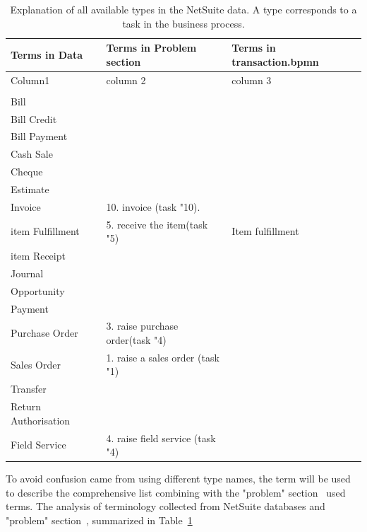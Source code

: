

\begin{table}[htb]
\footnotesize	 %
\begin{tabularx}{\textwidth}{X|X|X}
\hline
\textbf{Terms in Data} & \textbf{Terms in Problem section} & \textbf{Terms in transaction.bpmn} \\
\hline
Column1 & column 2 & column 3 \\
\hline 
 & &  \\
\hline
Bill &  & \\
\hline
Bill Credit  & &  \\
\hline
Bill Payment &  & \\
\hline
Cash Sale  &  & \\
\hline
Cheque  &  & \\
\hline
Estimate  &  & \\
\hline
Invoice  & 10. invoice (task "10). &  \\
\hline
item Fulfillment  & 5. receive the item(task "5) & Item fulfillment \\
\hline
item Receipt  &  & \\
\hline
Journal  &  \\
\hline
Opportunity  &  \\
\hline
Payment  &  \\
\hline
Purchase Order  & 3. raise purchase order(task "4)  \\
\hline
Sales Order  & 1. raise a sales order (task "1)  \\
\hline
Transfer  &  \\
\hline
Return Authorisation  &  \\
\hline
Field Service  & 4. raise field service (task "4)  \\
\hline
\end{tabularx}
\caption{Explanation of all available types in the NetSuite data. A type corresponds to a task in the business process.}
\label{table:terminologyData}
\end{table}

To avoid confusion came from using different type names, the term will be used to describe the comprehensive list combining with the "problem" section~\pageref{figure:soAndfieldservice} used terms. The analysis of terminology collected from NetSuite databases and "problem" section~\pageref{figure:soAndfieldservice}, summarized in Table~\ref{table:terminologyData}

